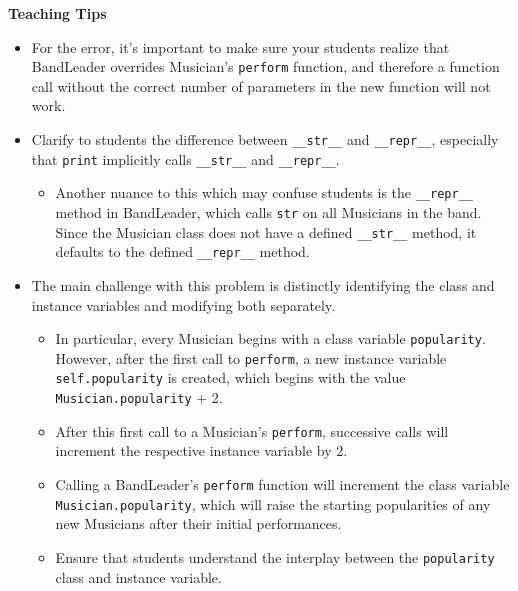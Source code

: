\begin{guide}
    \textbf{Teaching Tips}
    \begin{itemize}
       \item For the error, it's important to make sure your students realize that BandLeader overrides Musician's \lstinline{perform} function, and therefore a function call without the correct number of parameters in the new function will not work.
       \item Clarify to students the difference between \lstinline{__str__} and \lstinline{__repr__}, especially that \lstinline{print} implicitly calls \lstinline{__str__} and \lstinline{__repr__}.
       \begin{itemize}
            \item Another nuance to this which may confuse students is the \lstinline{__repr__} method in BandLeader, which calls \lstinline{str} on all Musicians in the band. Since the Musician class does not have a defined \lstinline{__str__} method, it defaults to the defined \lstinline{__repr__} method.
       \end{itemize}
       \item The main challenge with this problem is distinctly identifying the class and instance variables and modifying both separately.
       \begin{itemize}
            \item In particular, every Musician begins with a class variable \lstinline{popularity}. However, after the first call to \lstinline{perform}, a new instance variable \lstinline{self.popularity} is created, which begins with the value \lstinline{Musician.popularity} + 2.
            \item After this first call to a Musician's \lstinline{perform}, successive calls will increment the respective instance variable by 2.
            \item Calling a BandLeader's \lstinline{perform} function will increment the class variable \lstinline{Musician.popularity}, which will raise the starting popularities of any new Musicians after their initial performances.
            \item Ensure that students understand the interplay between the \lstinline{popularity} class and instance variable.
       \end{itemize}
     \end{itemize}
 \end{guide}